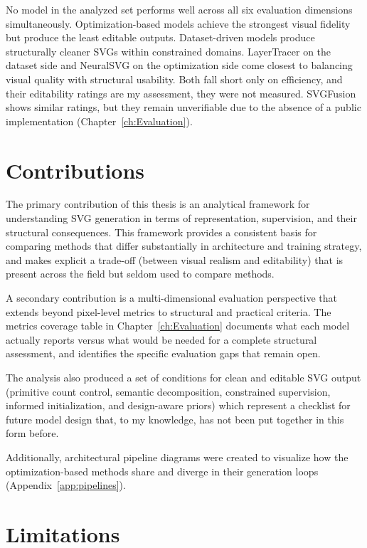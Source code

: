 No model in the analyzed set performs well across all 
six evaluation dimensions simultaneously. Optimization-based
models achieve the strongest visual fidelity but 
produce the least editable outputs. Dataset-driven 
models produce structurally cleaner SVGs within 
constrained domains. LayerTracer on the dataset side and 
NeuralSVG on the optimization side come closest to balancing 
visual quality with structural usability. Both fall short 
only on efficiency, and their editability ratings are 
my assessment, they were not measured. SVGFusion shows similar 
ratings, but they remain unverifiable due to the absence 
of a public implementation (Chapter~\ref{ch:Evaluation}).


\section{Contributions}

The primary contribution of this thesis is an 
analytical framework for understanding SVG generation 
in terms of representation, supervision, and their 
structural consequences. This framework provides a 
consistent basis for comparing methods that differ 
substantially in architecture and training strategy, 
and makes explicit a trade-off (between visual realism 
and editability) that is present across the field but 
seldom used to compare methods.

A secondary contribution is a multi-dimensional 
evaluation perspective that extends beyond pixel-level 
metrics to structural and practical criteria. The 
metrics coverage table in Chapter~\ref{ch:Evaluation} 
documents what each model actually reports versus what 
would be needed for a complete structural assessment, 
and identifies the specific evaluation gaps that remain 
open.

The analysis also produced a set of conditions for 
clean and editable SVG output (primitive count control, 
semantic decomposition, constrained 
supervision, informed initialization, and design-aware 
priors) which represent a checklist for future model 
design that, to my knowledge, has not been put together 
in this form before.

Additionally, architectural pipeline diagrams were 
created to visualize how the optimization-based 
methods share and diverge in their generation loops 
(Appendix~\ref{app:pipelines}).

\section{Limitations}

